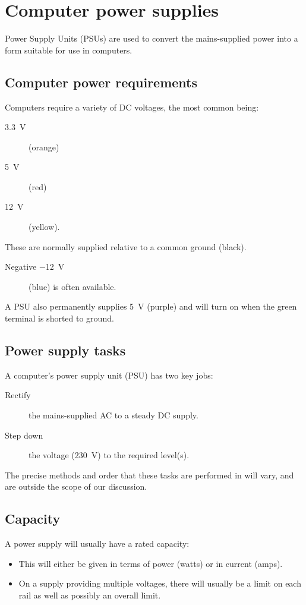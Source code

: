 \documentclass{pgnotes}
\begin{document}
\section{Computer power supplies}

Power Supply Units (PSUs) are used to convert the mains-supplied power into a form suitable for use in computers.

\subsection{Computer power requirements}

Computers require a variety of DC voltages, the most common being:
\begin{description}
\item[\SI{3.3}{\volt}] (orange)
\item[\SI{5}{\volt}] (red)
\item[\SI{12}{\volt}] (yellow).
\end{description}
These are normally supplied relative to a common ground (black).
\begin{description}
\item[Negative \SI{-12}{\volt}] (blue) is often available.
\end{description}
A PSU also permanently supplies \SI{5}{\volt} (purple) and will turn on when the green terminal is shorted to ground.

\subsection{Power supply tasks}

A computer's power supply unit (PSU) has two key jobs:
\begin{description}
\item[Rectify] the mains-supplied AC to a steady DC supply.
\item[Step down] the voltage (\SI{230}{\volt}) to the required level(s).
\end{description}
The precise methods and order that these tasks are performed in will vary, and are outside the scope of our discussion.

\subsection{Capacity}

A power supply will usually have a rated capacity:
\begin{itemize}
\item This will either be given in terms of power (watts) or in current (amps).
\item On a supply providing multiple voltages, there will usually be a limit on each rail as well as possibly an overall limit.
\end{itemize}
\end{document}

